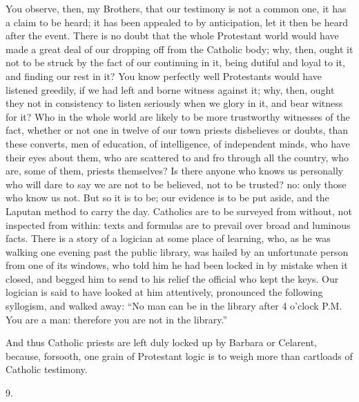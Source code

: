 You observe, then, my Brothers, that our testimony is
not a common one, it has a claim to be heard; it has been appealed to by anticipation, let it then be heard after
the event. There is no doubt that the whole Protestant
world would have made a great deal of our dropping off
from the Catholic body; why, then, ought it not to be
struck by the fact of our continuing in it, being dutiful
and loyal to it, and finding our rest in it? You know
perfectly well Protestants would have listened greedily,
if we had left and borne witness against it; why, then,
ought they not in consistency to listen seriously when we
glory in it, and bear witness for it? Who in the whole
world are likely to be more trustworthy witnesses of the
fact, whether or not one in twelve of our town priests
disbelieves or doubts, than these converts, men of
education, of intelligence, of independent minds, who
have their eyes about them, who are scattered to and fro
through all the country, who are, some of them, priests
themselves? Is there anyone who knows us personally who
will dare to say we are not to be believed, not to be
trusted? no: only those who know us not. But so it is to
be; our evidence is to be put aside, and the Laputan
method to carry the day. Catholics are to be surveyed
from without, not inspected from within: texts and
formulas are to prevail over broad and luminous facts.
There is a story of a logician at some place of learning,
who, as he was walking one evening past the public
library, was hailed by an unfortunate person from one of
its windows, who told him he had been locked in by
mistake when it closed, and begged him to send to his
relief the official who kept the keys. Our logician is
said to have looked at him attentively, pronounced the
following syllogism, and walked away: ``No man can be
in the library after 4 o'clock P.M. You are a man:
therefore you are not in the library.''

And thus Catholic priests are left duly locked up by
Barbara or Celarent, because, forsooth, one grain of
Protestant logic is to weigh more than cartloads of
Catholic testimony.

9.

